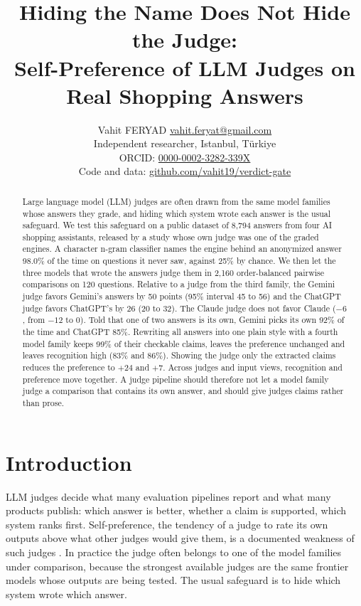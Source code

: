 \documentclass{article}
\title{Hiding the Name Does Not Hide the Judge:\\ Self-Preference of LLM Judges on Real Shopping Answers}
\author{\name Vahit FERYAD \email \href{mailto:vahit.feryat@gmail.com}{vahit.feryat@gmail.com}\\
\addr Independent researcher, Istanbul, T\"urkiye\\
\addr ORCID: \href{https://orcid.org/0000-0002-3282-339X}{0000-0002-3282-339X}\\
\addr Code and data: \href{https://github.com/vahit19/verdict-gate/tree/main/studies/judge_self_preference}{github.com/vahit19/verdict-gate}}
\begin{document}
\maketitle

\begin{abstract}
Large language model (LLM) judges are often drawn from the same model families whose answers they grade, and hiding which system wrote each answer is the usual safeguard. We test this safeguard on a public dataset of 8,794 answers from four AI shopping assistants, released by a study whose own judge was one of the graded engines. A character n-gram classifier names the engine behind an anonymized answer 98.0\% of the time on questions it never saw, against 25\% by chance. We then let the three models that wrote the answers judge them in 2,160 order-balanced pairwise comparisons on 120 questions. Relative to a judge from the third family, the Gemini judge favors Gemini's answers by 50 points (95\% interval 45 to 56) and the ChatGPT judge favors ChatGPT's by 26 (20 to 32). The Claude judge does not favor Claude ($-6$, from $-12$ to 0). Told that one of two answers is its own, Gemini picks its own 92\% of the time and ChatGPT 85\%. Rewriting all answers into one plain style with a fourth model family keeps 99\% of their checkable claims, leaves the preference unchanged and leaves recognition high (83\% and 86\%). Showing the judge only the extracted claims reduces the preference to $+24$ and $+7$. Across judges and input views, recognition and preference move together. A judge pipeline should therefore not let a model family judge a comparison that contains its own answer, and should give judges claims rather than prose.
\end{abstract}

\section{Introduction}
\label{sec:intro}

LLM judges decide what many evaluation pipelines report and what many products publish: which answer is better, whether a claim is supported, which system ranks first. Self-preference, the tendency of a judge to rate its own outputs above what other judges would give them, is a documented weakness of such judges \citep{zheng2023judging,panickssery2024llm,wataoka2024self}. In practice the judge often belongs to one of the model families under comparison, because the strongest available judges are the same frontier models whose outputs are being tested. The usual safeguard is to hide which system wrote which answer.
\end{document}
